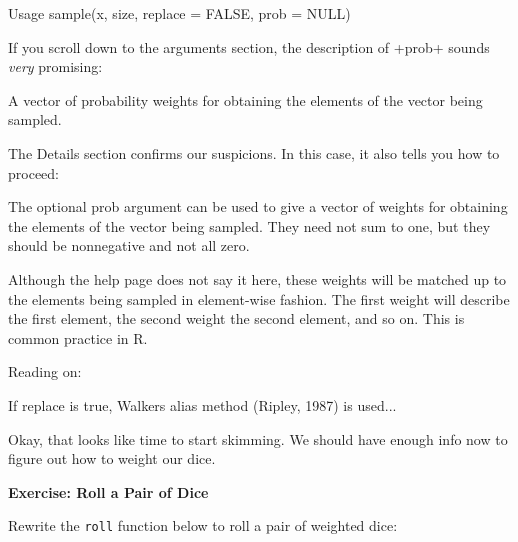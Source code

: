 \documentclass[
  letterpaper,
  DIV=11,
  numbers=noendperiod]{scrbook}
\newenvironment{Shaded}{\begin{snugshade}}{\end{snugshade}}
\newcommand{\NormalTok}[1]{\textcolor[rgb]{0.00,0.23,0.31}{#1}}
\begin{document}
\begin{Shaded}
\begin{Highlighting}[]
\NormalTok{Usage}
\NormalTok{    sample(x, size, replace = FALSE, prob = NULL)}
\end{Highlighting}
\end{Shaded}

If you scroll down to the arguments section, the description of +prob+
sounds \emph{very} promising:

\begin{Shaded}
\begin{Highlighting}[]
\NormalTok{A vector of probability weights for obtaining the elements of the vector being }
\NormalTok{sampled.}
\end{Highlighting}
\end{Shaded}

The Details section confirms our suspicions. In this case, it also tells
you how to proceed:

\begin{Shaded}
\begin{Highlighting}[]
\NormalTok{The optional prob argument can be used to give a vector of weights for obtaining }
\NormalTok{the elements of the vector being sampled. They need not sum to one, but they }
\NormalTok{should be nonnegative and not all zero.}
\end{Highlighting}
\end{Shaded}

Although the help page does not say it here, these weights will be
matched up to the elements being sampled in element-wise fashion. The
first weight will describe the first element, the second weight the
second element, and so on. This is common practice in R.

Reading on:

\begin{Shaded}
\begin{Highlighting}[]
\NormalTok{If replace is true, Walker\textquotesingle{}s alias method (Ripley, 1987) is used...}
\end{Highlighting}
\end{Shaded}

Okay, that looks like time to start skimming. We should have enough info
now to figure out how to weight our dice.

\begin{tcolorbox}[enhanced jigsaw, left=2mm, breakable, colback=white, colframe=quarto-callout-color-frame, leftrule=.75mm, bottomrule=.15mm, arc=.35mm, opacityback=0, rightrule=.15mm, toprule=.15mm]

\vspace{-3mm}\textbf{Exercise: Roll a Pair of Dice}\vspace{3mm}

Rewrite the \texttt{roll} function below to roll a pair of weighted
dice:

\end{tcolorbox}
\end{document}
